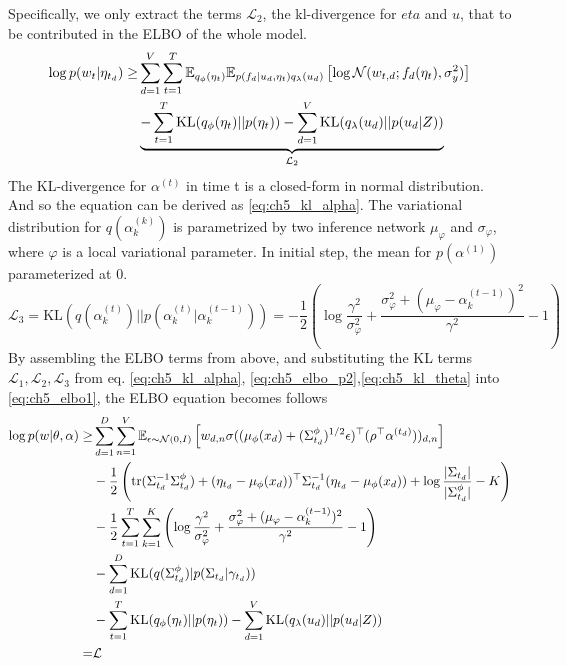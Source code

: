 Specifically, we only extract the terms $ \mathcal{L}_{2} $, the kl-divergence for $ eta $ and $ u $, that to be contributed in the ELBO of the whole model.
\begin{align}\label{eq:ch5_elbo_p2}
\log p(w_t|\eta_{t_d})\geq&\sum_{d=1}^{V}\sum_{t=1}^{T}\mathbb{E}_{q_\phi(\eta_t)}\mathbb{E}_{p(f_d|u_d,\eta_t)q_{\lambda}(u_d)}\left[\log\mathcal{N}(w_{t,d};f_d(\eta_t),\sigma_y^2)\right]\notag\\
&\underbrace{-\sum_{t=1}^{T}\text{KL}(q_{\phi}(\eta_t)||p(\eta_t))-\sum_{d=1}^{V}\text{KL}(q_\lambda(u_d)||p(u_d|Z))}_{\mathcal{L}_2}
\end{align}
The KL-divergence for $ \alpha^{(t)} $ in time t is a closed-form in normal distribution. And so the equation can be derived as \ref{eq:ch5_kl_alpha}. The variational distribution for $ q(\alpha_k^{(k)}) $ is parametrized by two inference network $ \mu_{\varphi} $ and $ \sigma_{\varphi} $, where $ \varphi $ is a local variational parameter.
In initial step, the mean for $ p(\alpha^{(1)}) $ parameterized at 0.
\begin{equation}\label{eq:ch5_kl_alpha}
\mathcal{L}_{3}=\text{KL}(q(\alpha_k^{(t)})||p(\alpha_k^{(t)}|\alpha^{(t-1)}_k))=-\frac{1}{2}\left(\log\frac{\gamma^2}{\sigma_\varphi^2}+\frac{\sigma_\varphi^2+(\mu_\varphi-\alpha_k^{(t-1)})^2}{\gamma^2}-1\right)
\end{equation}
By assembling the ELBO terms from above, and substituting the KL terms $ \mathcal{L}_{1},\mathcal{L}_{2},\mathcal{L}_{3} $ from eq. \ref{eq:ch5_kl_alpha}, \ref{eq:ch5_elbo_p2},\ref{eq:ch5_kl_theta} into \ref{eq:ch5_elbo1}, the ELBO equation becomes follows
\begin{align}\label{eq:ch6_elbo2}
\log p(w|\theta,\alpha)\geq&\sum_{d=1}^{D}\sum_{n=1}^{V}\mathbb{E}_{\epsilon\sim\mathcal{N}(0,I)}\left[w_{d,n}\sigma((\mu_{\phi}(x_d)+(\Sigma^{\phi}_{t_d})^{1/2}\epsilon)^\top(\rho^\top\alpha^{(t_d)}))_{d,n}\right]\notag\\
&-\frac{1}{2}\left(\text{tr}(\Sigma_{t_d}^{-1}\Sigma_{t_d}^{\phi})+(\eta_{t_d}-\mu_{\phi}(x_d))^\top\Sigma_{t_d}^{-1}(\eta_{t_d}-\mu_{\phi}(x_d))+\log\frac{|\Sigma_{t_d}|}{|\Sigma^{\phi}_{t_d}|}-K\right)\notag\\
&-\frac{1}{2}\sum_{t=1}^{T}\sum_{k=1}^{K}\left(\log\frac{\gamma^2}{\sigma_\varphi^2}+\frac{\sigma_\varphi^2+(\mu_\varphi-\alpha_k^{(t-1)})^2}{\gamma^2}-1\right)\notag\\
&-\sum_{d=1}^{D}\text{KL}(q(\Sigma^{\phi}_{t_d})|p(\Sigma_{t_d}|\gamma_{t_d}))\notag\\
&-\sum_{t=1}^{T}\text{KL}(q_{\phi}(\eta_t)||p(\eta_t))-\sum_{d=1}^{V}\text{KL}(q_\lambda(u_d)||p(u_d|Z))\notag\\
=&\mathcal{L}
\end{align}
